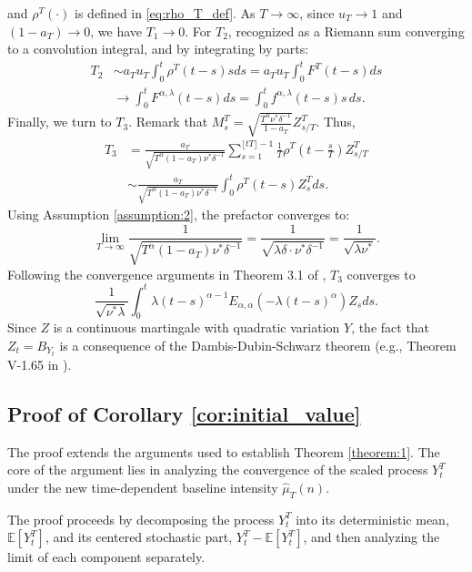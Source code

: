 \documentclass[letterpaper]{article}
\numberwithin{equation}{section}
\theoremstyle{definition}
\theoremstyle{remark}
\begin{document}
  and $\rho^T(\cdot)$ is defined in \eqref{eq:rho_T_def}. {As $T \to \infty$, since $u_T \to 1$ and $(1-a_T) \to 0$, we have $T_1 \to 0$. 
For $T_2$, recognized as a Riemann sum converging to a convolution integral, and by integrating by parts:
\begin{align*}
  T_2 &\sim a_Tu_T\int_0^t\rho^T(t-s)sds = a_Tu_T\int_0^t F^T(t-s)ds \\
      &\rightarrow \int_0^t F^{\alpha,\lambda}(t-s)ds = \int_0^t f^{\alpha,\lambda}(t-s)s \, ds.
\end{align*}
Finally, we turn to $T_3$. Remark that $M_s^T = \sqrt{\frac{T^\alpha \nu^*\delta^{-1}}{1-a_T}}Z_{s/T}^T$. Thus,
\begin{align*}
  T_3 &= \frac{a_T}{\sqrt{T^\alpha (1-a_T)\nu^*\delta^{-1}}} \sum_{s=1}^{\lfloor tT \rfloor-1}\frac1{T}\rho^T\left(t-\frac{s}{T}\right)Z_{s/T}^T \\
      &\sim \frac{a_T}{\sqrt{T^\alpha (1-a_T)\nu^*\delta^{-1}}} \int_0^t\rho^T(t-s)Z_s^T ds.
\end{align*}
Using Assumption \ref{assumption:2}, the prefactor converges to:
\[
    \lim_{T\to\infty} \frac{1}{\sqrt{T^\alpha (1-a_T)\nu^*\delta^{-1}}} = \frac{1}{\sqrt{\lambda\delta \cdot \nu^*\delta^{-1}}} = \frac{1}{\sqrt{\lambda\nu^*}}.
\]
Following the convergence arguments in Theorem 3.1 of \cite{jaisson2016rough}, $T_3$ converges to
\[
  \frac1{\sqrt{\nu^*\lambda}}\int_0^t \lambda(t-s)^{\alpha-1}E_{\alpha,\alpha}(-\lambda(t-s)^\alpha)Z_s ds.
\]
Since $Z$ is a continuous martingale with quadratic variation $Y$, the fact that $Z_t=B_{Y_t}$ is a consequence of the Dambis-Dubin-Schwarz theorem (e.g., Theorem V-1.65 in \cite{revuz2013continuous}).}


\subsection{Proof of Corollary \ref{cor:initial_value}}
\label{subsec:proofofcorollaryinitialvalue}
The proof extends the arguments used to establish Theorem \ref{theorem:1}. The core of the argument lies in analyzing the convergence of the scaled process $Y_t^T$ under the new time-dependent baseline intensity $\hat{\mu}_T(n)$.

The proof proceeds by decomposing the process $Y_t^T$ into its deterministic mean, $\mathbb{E}[Y_t^T]$, and its centered stochastic part, $Y_t^T - \mathbb{E}[Y_t^T]$, and then analyzing the limit of each component separately.
\end{document}
